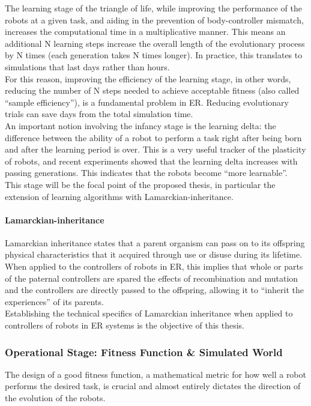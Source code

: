 \documentclass{scrartcl}
\begin{document}
The learning stage of the triangle of life, while improving the performance of the robots at a given task, and aiding in the prevention of body-controller mismatch, increases the computational time in a multiplicative manner.
This means an additional N learning steps increase the overall length of the evolutionary process by N times (each generation takes N times longer).
In practice, this translates to simulations that last days rather than hours.\\

For this reason, improving the efficiency of the learning stage, in other words, reducing the number of N steps needed to achieve acceptable fitness (also called ``sample efficiency''), is a fundamental problem in ER.
Reducing evolutionary trials can save days from the total simulation time. \\

An important notion involving the infancy stage is the learning delta: the difference between the ability of a robot to perform a task right after being born and after the learning period is over.
This is a very useful tracker of the plasticity of robots, and recent experiments showed \cite{Luo2022} that the learning delta increases with passing generations.
This indicates that the robots become ``more learnable''. \\

This stage will be the focal point of the proposed thesis, in particular the extension of learning algorithms with Lamarckian-inheritance.

\paragraph{Lamarckian-inheritance}
Lamarckian inheritance states that a parent organism can pass on to its offspring physical characteristics that it acquired through use or disuse during its lifetime. \\

When applied to the controllers of robots in ER, this implies that whole or parts of the paternal controllers are spared the effects of recombination and mutation and the controllers are directly passed to the offspring, allowing it to ``inherit the experiences'' of its parents. \\

Establishing the technical specifics of Lamarckian inheritance when applied to controllers of robots in ER systems is the objective of this thesis.

\subsubsection{Operational Stage: Fitness Function \& Simulated World}
The design of a good fitness function, a mathematical metric for how well a robot performs the desired task, is crucial and almost entirely dictates the direction of the evolution of the robots.\\
\end{document}
